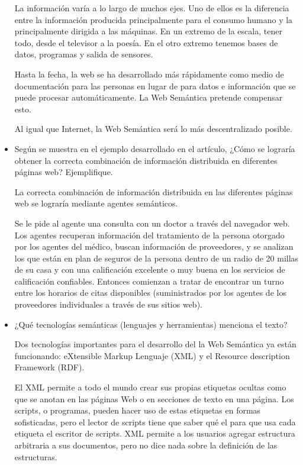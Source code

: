 \documentclass[a4paper,12pt,oneside,final,spanish]{article}
\begin{document}
\begin{itemize}
La información varía a lo largo de muchos ejes. Uno de ellos es la diferencia entre la información producida principalmente para el consumo humano y la principalmente dirigida a las máquinas. En un extremo de la escala, tener todo, desde el televisor a la poesía. En el otro extremo tenemos bases de datos, programas y salida de sensores. 

Hasta la fecha, la web se ha desarrollado más rápidamente como medio de documentación para las personas en lugar de para datos e información que se puede procesar automáticamente. La Web Semántica pretende compensar esto.

Al igual que Internet, la Web Semántica será lo más descentralizado posible.
 
\item Según se muestra en el ejemplo desarrollado en el artículo, ¿Cómo se lograría 
obtener la correcta combinación de información distribuida en diferentes páginas web? Ejemplifique. 

La correcta combinación de información distribuida en las diferentes páginas web se lograría mediante agentes semánticos.

Se le pide al agente una consulta con un doctor a través del navegador web. Los agentes recuperan información del tratamiento de la persona otorgado por los agentes del médico, buscan información de proveedores, y se analizan los que están en plan de seguros de la persona dentro de un radio de 20 millas de su casa y con una calificación excelente o muy buena en los servicios de calificación confiables. Entonces comienzan a tratar de encontrar un turno entre los horarios de citas disponibles (suministrados por los agentes de los proveedores individuales a través de sus sitios web).

\item ¿Qué tecnologías semánticas (lenguajes y herramientas) menciona el texto?

Dos tecnologías importantes para el desarrollo del la Web Semántica ya están funcionando: eXtensible Markup Lenguaje (XML) y el Resource description Framework (RDF).

El XML permite a todo el mundo crear sus propias etiquetas ocultas como que se anotan en las páginas Web o en secciones de texto en una página. Los scripts, o programas, pueden hacer uso de estas etiquetas en formas sofisticadas, pero el lector de scripts tiene que saber qué el para que usa cada etiqueta el escritor de scripts. XML permite a los usuarios agregar estructura arbitraria a sus documentos, pero no dice nada sobre la definición de las estructuras.


\end{itemize}
\end{document}
